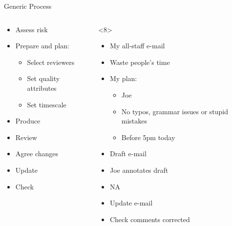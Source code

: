 \documentclass{beamer}
\begin{document}
\begin{frame}[fragile]{Generic Process}
  \begin{columns}
     \begin{column}{4.0cm}
	\vskip 0.5cm
        \begin{itemize}
           \item<1-> Assess risk
           \item<2-> Prepare and plan:
           \begin{itemize}
               \item<2-> Select reviewers
               \item<2-> Set quality attributes
               \item<2-> Set timescale
           \end{itemize}
           \item<3-> Produce
           \item<4-> Review
           \item<5-> Agree changes
           \item<6-> Update
           \item<7-> Check
        \end{itemize}
     \end{column}
     \begin{column}{6.0cm}
        \begin{onlyenv}<8>
           \begin{itemize}
              \item My all-staff e-mail
              \item Waste people's time
              \item My plan:
              \begin{itemize}
                  \item Joe
                  \item No typos, grammar issues or stupid mistakes
                  \item Before 5pm today
              \end{itemize}
              \item Draft e-mail
              \item Joe annotates draft
              \item NA
              \item Update e-mail
              \item Check comments corrected
           \end{itemize}
        \end{onlyenv}

\end{column}
\end{columns}
\end{frame}
\end{document}
